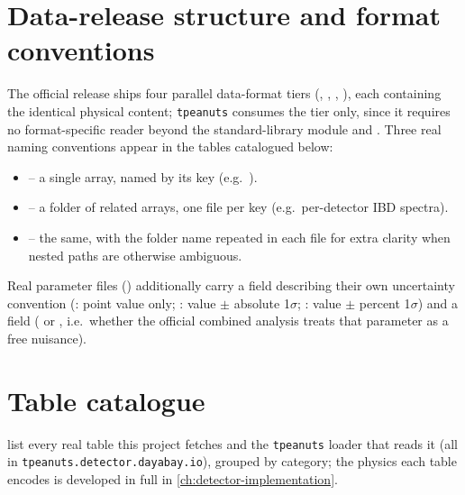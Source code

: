 \section{Data-release structure and format conventions}

\begin{theorybox}
The official release ships four parallel data-format tiers (,
, , ), each containing the identical
physical content; \texttt{tpeanuts} consumes the  tier only,
since it requires no format-specific reader beyond the standard-library
 module and . Three real naming conventions appear
in the tables catalogued below:
\begin{itemize}
  \item {} -- a single array, named by
    its key (e.g.\ ).
  \item {} -- a folder of related
    arrays, one file per key (e.g.\ per-detector IBD spectra).
  \item {} -- the same,
    with the folder name repeated in each file for extra clarity when
    nested paths are otherwise ambiguous.
\end{itemize}
Real parameter files () additionally carry a
 field describing their own uncertainty convention
(: point value only; : value $\pm$
absolute 1$\sigma$; : value $\pm$ percent 1$\sigma$)
and a  field ( or , i.e.\ whether the
official combined analysis treats that parameter as a free nuisance).
\end{theorybox}

\section{Table catalogue}

list every real table this project fetches and the \texttt{tpeanuts}
loader that reads it (all in \texttt{tpeanuts.detector.dayabay.io}),
grouped by category; the physics each table encodes is developed in full
in \cref{ch:detector-implementation}.

\newcommand{\dbcell}[1]{\parbox[t]{0.47\textwidth}{\raggedright #1}}


